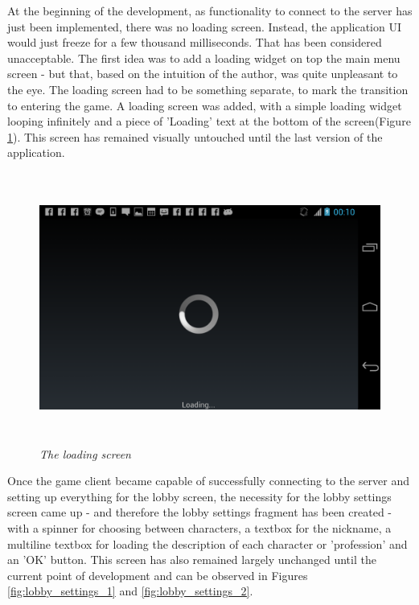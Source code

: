 \documentclass{article}
\begin{document}
At the beginning of the development, as functionality to connect to the server
has just been implemented, there was no loading screen. Instead, the application
UI would just freeze for a few thousand milliseconds. That has been considered
unacceptable. The first idea was to add a loading widget on top the main menu
screen - but that, based on the intuition of the author, was quite unpleasant to
the eye. The loading screen had to be something separate, to mark the transition
to entering the game. A loading screen was added, with a simple loading widget
looping infinitely and a piece of 'Loading' text at the bottom of the
screen(Figure \ref{fig:loading}). This screen has remained visually untouched
until the last version of the application.\newline

\begin{figure}
\includegraphics[height=3.5in,width=6.23in]{./images/android_screenshots/tutorial_loading.png}
\caption{\small \sl The loading screen\label{fig:loading}}
\end{figure}

Once the game client became capable of successfully connecting to the server and
setting up everything for the lobby screen, the necessity for the lobby settings
screen came up - and therefore the lobby settings fragment has been created -
with a spinner for choosing between characters, a textbox for the nickname, a
multiline textbox for loading the description of each character or 'profession'
and an 'OK' button. This screen has also remained largely unchanged until the
current point of development and can be observed in Figures
\ref{fig:lobby_settings_1} and \ref{fig:lobby_settings_2}.
\end{document}
